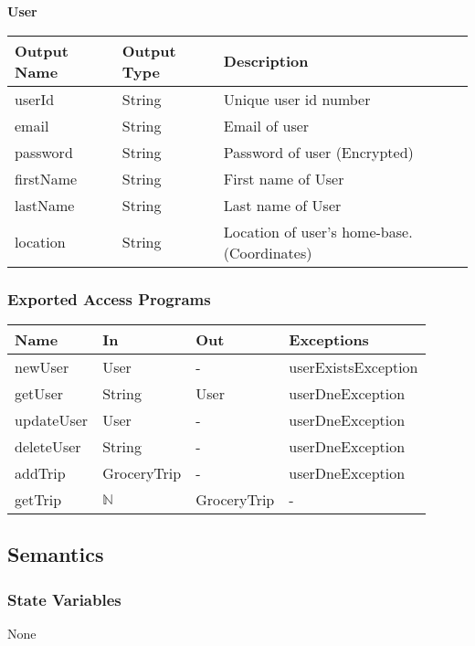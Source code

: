 \documentclass[12pt, titlepage]{article}
\begin{document}
\noindent \textbf{User}

\begin{table}[H]
  \begin{tabular}{|p{}|p{}|p{}|}
    \hline
    \textbf{Output Name} & \textbf{Output Type} & \textbf{Description} \\
    \hline
    userId & String & Unique user id number \\
    \hline
    email & String & Email of user \\
    \hline
    password & String & Password of user (Encrypted) \\
    \hline
    firstName & String & First name of User \\
    \hline
    lastName & String & Last name of User \\
    \hline
    location & String & Location of user's home-base. (Coordinates) \\
    \hline
  \end{tabular}
\end{table}

\subsubsection{Exported Access Programs}

\begin{center}
\begin{tabular}{p{5cm} p{3cm} p{3cm} p{5cm}}
\hline
\textbf{Name} & \textbf{In} & \textbf{Out} & \textbf{Exceptions} \\
\hline
newUser & User & - & userExistsException \\
getUser & String & User & userDneException \\
updateUser & User & - & userDneException \\
deleteUser & String & - & userDneException \\
addTrip & GroceryTrip & - & userDneException \\
getTrip & $\mathbb{N}$ & GroceryTrip & - \\
\hline
\end{tabular}
\end{center}

\subsection{Semantics}

\subsubsection{State Variables}
None
\end{document}
